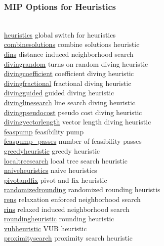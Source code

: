 \subsubsection{MIP Options for Heuristics}
\begin{tabbing}
\hspace {1.3in} \= \\
\hyperlink{heuristics}
{heuristics} \> global switch for heuristics \\
\hyperlink{combinesolutions}
{combinesolutions} \> combine solutions heuristic \\
\hyperlink{dins}
{dins} \> distance induced neighborhood search \\
\hyperlink{divingrandom}
{divingrandom} \> turns on random diving heuristic \\
\hyperlink{divingcoefficient}
{divingcoefficient} \> coefficient diving heuristic \\
\hyperlink{divingfractional}
{divingfractional} \> fractional diving heuristic \\
\hyperlink{divingguided}
{divingguided} \> guided diving heuristic \\
\hyperlink{divinglinesearch}
{divinglinesearch} \> line search diving heuristic \\
\hyperlink{divingpseudocost}
{divingpseudocost} \> pseudo cost diving heuristic \\
\hyperlink{divingvectorlength}
{divingvectorlength} \> vector length diving heuristic \\
\hyperlink{feaspump}
{feaspump} \> feasibility pump \\
\hyperlink{feaspump_passes}
{feaspump\_passes} \> number of feasibility passes \\
\hyperlink{greedyheuristic}
{greedyheuristic} \> greedy heuristic \\
\hyperlink{localtreesearch}
{localtreesearch} \> local tree search heuristic \\
\hyperlink{naiveheuristics}
{naiveheuristics} \> naive heuristics \\
\hyperlink{pivotandfix}
{pivotandfix} \> pivot and fix heuristic \\
\hyperlink{randomizedrounding}
{randomizedrounding} \> randomized rounding heuristis \\
\hyperlink{rens}
{rens} \> relaxation enforced neighborhood search \\
\hyperlink{rins}
{rins} \> relaxed induced neighborhood search \\
\hyperlink{roundingheuristic}
{roundingheuristic} \> rounding heuristic \\
\hyperlink{vubheuristic}
{vubheuristic} \> VUB heuristic \\
\hyperlink{proximitysearch}
{proximitysearch} \> proximity search heuristic
\end{tabbing}

